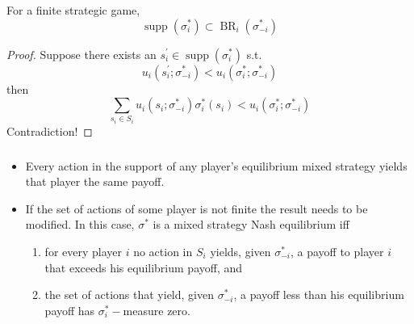 \documentclass[UTF8,11pt,colorlinks,compress,openany]{beamer}%
\begin{document}
\begin{frame}\frametitle{}
\begin{theorem}
	For a finite strategic game,
	\[\operatorname{supp}(\sigma_i^*)\subset \operatorname{BR}_i(\sigma_{-i}^*)\]
\end{theorem}
\begin{proof}
	Suppose there exists an $s_i^\prime\in \operatorname{supp}(\sigma_i^*)$ s.t. \[u_i(s_i^\prime;\sigma_{-i}^*)<u_i(\sigma_i^*;\sigma_{-i}^*)\]
	then \[\sum\limits_{s_i\in S_i}u_i(s_i;\sigma_{-i}^*)\sigma_i^*(s_i)<u_i(\sigma_i^*;\sigma_{-i}^*)\]
	Contradiction!
\end{proof}
\end{frame}

\begin{frame}\frametitle{}
\begin{itemize}
	\item Every action in the support of any player's equilibrium mixed strategy yields that player the same payoff.
	\item If the set of actions of some player is not finite the result needs to be modified. In this case, $\sigma^*$ is a mixed strategy Nash equilibrium iff
	\begin{enumerate}
		\item for every player $i$ no action in $S_i$ yields, given $\sigma_{-i}^*$, a payoff to player $i$ that exceeds his equilibrium payoff, and
		\item the set of actions that yield, given $\sigma_{-i}^*$, a payoff less than his equilibrium payoff has $\sigma_i^*-$measure zero.
	\end{enumerate}
\end{itemize}
\end{frame}
\end{document}
